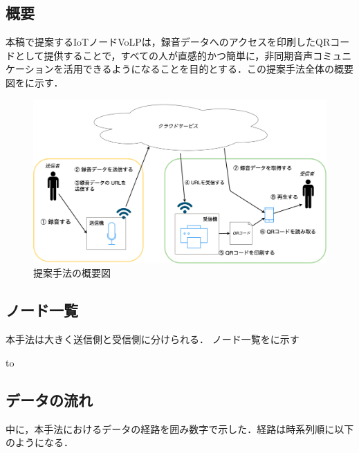 \documentclass[submit,techrep,noauthor]{ipsj}
\begin{document}
\subsection{概要}
本稿で提案するIoTノードVoLPは，録音データへのアクセスを印刷したQRコードとして提供することで，すべての人が直感的かつ簡単に，非同期音声コミュニケーションを活用できるようになることを目的とする．この提案手法全体の概要図をに示す．\par

\begin{figure}[tb]
\includegraphics[scale=0.15,bb= 0 0 2000 1000]{image/system_drawio.png}
\caption{提案手法の概要図}
\label{fig:sys-overview}
\end{figure}

\subsection{ノード一覧}
本手法は大きく送信側と受信側に分けられる．
ノード一覧をに示す

\begin{table}[tb] 
\caption{ノード一覧} 
\label{tab:sys-nodes}
\hbox to
\end{table}

\subsection{データの流れ}
\label{dataflow}
中に，本手法におけるデータの経路を囲み数字で示した．経路は時系列順に以下のようになる．
\end{document}
